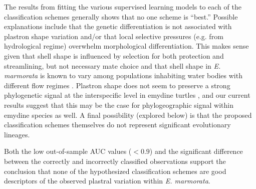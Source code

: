 \documentclass[12pt,letterpaper]{article}
\begin{document}
The results from fitting the various supervised learning models to each of the classification schemes generally shows that no one scheme is ``best.'' Possible explanations include that the genetic differentiation is not associated with plastron shape variation and/or that local selective pressures (e.g. from hydrological regime) overwhelm morphological differentiation. This makes sense given that shell shape is influenced by selection for both protection and streamlining, but not necessary mate choice \citep{Rivera2008,Rivera2011,Stayton2011,Rivera2014,Pollyb} and that shell shape in \textit{E. marmorata} is known to vary among populations inhabiting water bodies with different flow regimes \citep{Holland1992,Lubcke2007,Germano2009}. Plastron shape does not seem to preserve a strong phylogenetic signal at the interspecific level in emydine turtles \citep{Angielczyk2011}, and our current results suggest that this may be the case for phylogeographic signal within emydine species as well. A final possibility (explored below) is that the proposed classification schemes themselves do not represent significant evolutionary lineages.

Both the low out-of-sample AUC values (\(< 0.9\)) and the significant difference between the correctly and incorrectly classified observations support the conclusion that none of the hypothesized classification schemes are good descriptors of the observed plastral variation within \textit{E. marmorata}.
\end{document}
